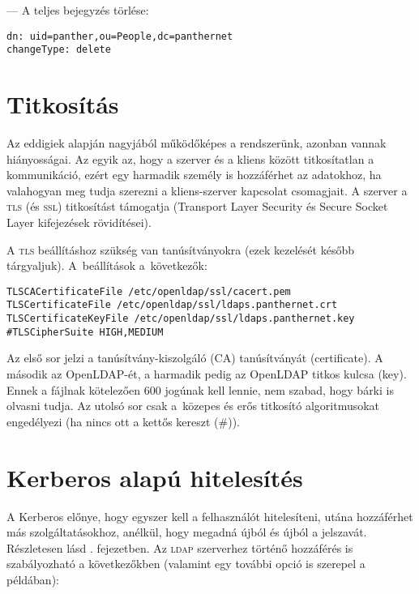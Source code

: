 \noindent --- A teljes bejegyzés törlése:
  
\begin{Verbatim}[frame=single]
dn: uid=panther,ou=People,dc=panthernet
changeType: delete
\end{Verbatim}



\section{Titkosítás}

Az eddigiek alapján nagyjából működőképes a rendszerünk, azonban vannak
hiányosságai. Az egyik az, hogy a szerver és a kliens között titkosítatlan a kommunikáció, ezért egy harmadik személy
is hozzáférhet az adatokhoz, ha valahogyan meg tudja szerezni a kliens-szerver kapcsolat csomagjait. A szerver a \textsc{tls}
(és \textsc{ssl}) titkosítást támogatja (Transport Layer Security és Secure Socket Layer kifejezések rövidítései).

A \textsc{tls} beállításhoz szükség van tanúsítványokra (ezek kezelését később tárgyaljuk). A~beállítások a~következők:

\begin{Verbatim}[frame=single]
TLSCACertificateFile /etc/openldap/ssl/cacert.pem
TLSCertificateFile /etc/openldap/ssl/ldaps.panthernet.crt
TLSCertificateKeyFile /etc/openldap/ssl/ldaps.panthernet.key
#TLSCipherSuite HIGH,MEDIUM
\end{Verbatim}  

Az első sor jelzi a tanúsítvány-kiszolgáló (CA) tanúsítványát (certificate). A második az OpenLDAP-ét, a harmadik pedig
az OpenLDAP titkos kulcsa (key). Ennek a fájlnak kötelezően 600 jogúnak kell lennie, nem szabad, hogy bárki is olvasni
tudja. Az utolsó sor csak a~közepes és erős titkosító algoritmusokat engedélyezi (ha nincs ott a kettős kereszt (\#)).






\section{Kerberos alapú hitelesítés}

A Kerberos előnye, hogy egyszer kell a felhasználót hitelesíteni, utána hozzáférhet más szolgáltatásokhoz, anélkül, hogy
megadná újból és újból a jelszavát. Részletesen lásd . fejezetben. Az \textsc{ldap} szerverhez történő
hozzáférés is szabályozható a következőkben (valamint egy további opció is szerepel a példában):


